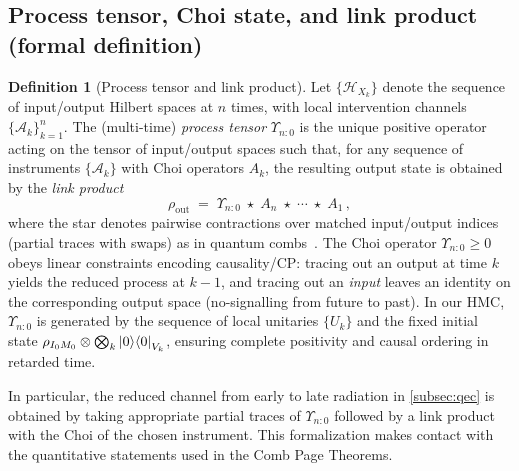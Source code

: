 \documentclass[a4paper,11pt]{article}
\newcommand{\HMC}{\textup{\textsc{HMC}}\xspace}
\theoremstyle{plain}
\theoremstyle{definition}
\newtheorem{definition}{Definition}
\theoremstyle{remark}
\begin{document}
\subsection{Process tensor, Choi state, and link product (formal definition)}
\label{subsec:process-tensor-def}
\begin{definition}[Process tensor and link product]
Let $\{\mathcal{H}_{X_k}\}$ denote the sequence of input/output Hilbert spaces at $n$ times, with local intervention channels $\{\mathcal{A}_k\}_{k=1}^n$. The (multi-time) \emph{process tensor} $\Upsilon_{n{:}0}$ is the unique positive operator acting on the tensor of input/output spaces such that, for any sequence of instruments $\{\mathcal{A}_k\}$ with Choi operators $A_k$, the resulting output state is obtained by the \emph{link product}
\begin{equation}
\rho_{\mathrm{out}} \;=\; \Upsilon_{n{:}0} \;\star\; A_n \;\star\; \cdots \;\star\; A_1 \,,
\end{equation}
where the star denotes pairwise contractions over matched input/output indices (partial traces with swaps) as in quantum combs~\cite{Chiribella:2009}. The Choi operator $\Upsilon_{n{:}0}\ge 0$ obeys linear constraints encoding causality/CP: tracing out an output at time $k$ yields the reduced process at $k{-}1$, and tracing out an \emph{input} leaves an identity on the corresponding output space (no-signalling from future to past). In our \HMC{}, $\Upsilon_{n{:}0}$ is generated by the sequence of local unitaries $\{U_k\}$ and the fixed initial state $\rho_{I_0M_0}\otimes\bigotimes_k \left|0\right\rangle\!\left\langle0\right|_{V_k}$, ensuring complete positivity and causal ordering in retarded time.
\end{definition}
In particular, the reduced channel from early to late radiation in \cref{subsec:qec} is obtained by taking appropriate partial traces of $\Upsilon_{n{:}0}$ followed by a link product with the Choi of the chosen instrument. This formalization makes contact with the quantitative statements used in the Comb Page Theorems.
\end{document}
